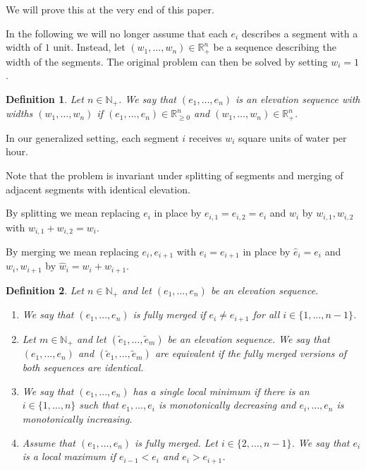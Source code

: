 \documentclass[11pt,a4paper]{article}
\newtheorem{defi}{Definition}
\newcommand{\Np}{\mathbb{N}_+}
\newcommand{\Rp}{\mathbb{R}_+}
\newcommand{\Rnn}{\mathbb{R}_{\ge0}}
\begin{document}
We will prove this at the very end of this paper.

In the following we will no longer assume that each $e_i$ describes a segment with a width of $1$ unit.
Instead, let $(w_1,\ldots,w_n) \in \Rp^n$ be a sequence describing the width of the segments.
The original problem can then be solved by setting $w_i = 1$.

\begin{defi}
  Let $n\in\Np$.
  We say that $(e_1,\ldots,e_n)$ is an elevation sequence with widths $(w_1,\ldots,w_n)$ if
  $(e_1,\ldots,e_n) \in \Rnn^n$ and $(w_1,\ldots,w_n) \in \Rp^n$.
\end{defi}

In our generalized setting, each segment $i$ receives $w_i$ square units of water per hour.

Note that the problem is invariant under splitting of segments and merging of adjacent segments with identical elevation.

By splitting we mean replacing $e_i$ in place by $e_{i,1} = e_{i,2} = e_i$ and $w_i$ by $w_{i,1}, w_{i,2}$ with $w_{i,1} + w_{i,2} = w_i$.

By merging we mean replacing $e_i, e_{i+1}$ with $e_i = e_{i+1}$ in place by $\hat{e}_i = e_i$ and $w_i, w_{i+1}$ by $\hat{w}_i = w_i + w_{i+1}$.

\begin{defi}
    Let $n\in\Np$ and let $(e_1,\ldots,e_n)$ be an elevation sequence.
    \begin{enumerate}
    \item We say that $(e_1,\ldots,e_n)$ is fully merged if $e_i \ne e_{i+1}$ for all $i\in\{1,\ldots,n - 1\}$.
    \item Let $m\in\Np$ and let $(\tilde{e}_1,\ldots,\tilde{e}_m)$ be an elevation sequence.
        We say that $(e_1,\ldots,e_n)$ and $(\tilde{e}_1,\ldots,\tilde{e}_m)$ are equivalent if the fully merged versions of both sequences are identical.
    \item We say that $(e_1,\ldots,e_n)$ has a single local minimum if there is an
    $i\in\{1,\ldots,n\}$ such that $e_1,\ldots,e_i$ is monotonically decreasing and $e_i,\ldots,e_n$ is monotonically increasing.
    \item Assume that $(e_1,\ldots,e_n)$ is fully merged.
        Let $i\in\{2,\ldots,n-1\}$.
        We say that $e_i$ is a local maximum if $e_{i-1}<e_i$ and $e_i>e_{i+1}$.
    \end{enumerate}
\end{defi}
\end{document}
